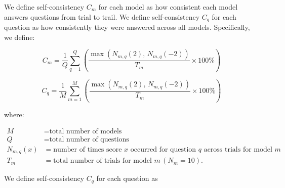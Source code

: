 We define self-consistency \(C_m\) for each model as how consistent each model answers questions from trial to trail. We define self-consistency \(C_q\) for each question as how consistently they were answered across all models. Specifically, we define:

\[
C_m = \frac{1}{Q}
  \sum_{q=1}^{Q}
  \left(\frac{
    \max\left(N_{m,q}(2),\, N_{m,q}(-2)\right)
  }{
    T_m
  }
  \times 100\% \right)
\]

\[
C_q =  \frac{1}{M} 
\sum_{m=1}^{M}
\left( \frac{
  \max\left(N_{m,q}(2),\, N_{m,q}(-2)\right)
  }{
    T_m
  }
\times 100\% \right)
\]

\noindent where:

\[
\begin{aligned}
M &= \text{total number of models} \\
Q &= \text{total number of questions} \\
N_{m,q}(x) &= \text{number of times score } x \text{ occurred for question } q \text{ across trials for model } m \\
T_m &= \text{total number of trials for model } m \, (N_m = 10).
\end{aligned}
\]

We define self-consistency \(C_q\) for each question as